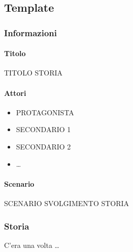 \documentclass[../../UUX_Personas.tex]{subfiles}
\begin{document}
	\subsection{Template}
	\subsubsection{Informazioni}
	\paragraph{Titolo} TITOLO STORIA
	\paragraph{Attori}
	\begin{itemize}
		\item PROTAGONISTA
		\item SECONDARIO 1
		\item SECONDARIO 2
		\item \ldots
	\end{itemize}
	\paragraph{Scenario} SCENARIO SVOLGIMENTO STORIA

	\newpage
	\subsubsection{Storia} 
	C'era una volta \ldots
\end{document}
